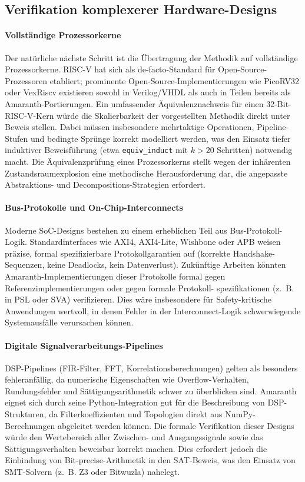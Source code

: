 ﻿\documentclass[12pt,a4paper]{report}
\begin{document}
\subsection{Verifikation komplexerer Hardware-Designs}

\paragraph{Vollständige Prozessorkerne}
Der natürliche nächste Schritt ist die Übertragung der Methodik auf vollständige
Prozessorkerne. RISC-V hat sich als de-facto-Standard für Open-Source-Prozessoren
etabliert; prominente Open-Source-Implementierungen wie PicoRV32 oder VexRiscv
existieren sowohl in Verilog/VHDL als auch in Teilen bereits als Amaranth-Portierungen.
Ein umfassender Äquivalenznachweis für einen 32-Bit-RISC-V-Kern würde die Skalierbarkeit
der vorgestellten Methodik direkt unter Beweis stellen. Dabei müssen insbesondere
mehrtaktige Operationen, Pipeline-Stufen und bedingte Sprünge korrekt modelliert werden,
was den Einsatz tiefer induktiver Beweisführung (etwa \texttt{equiv\_induct} mit
$k > 20$ Schritten) notwendig macht. Die Äquivalenzprüfung eines Prozessorkerns
stellt wegen der inhärenten Zustandsraumexplosion eine methodische Herausforderung dar,
die angepasste Abstraktions- und Decompositions-Strategien erfordert.

\paragraph{Bus-Protokolle und On-Chip-Interconnects}
Moderne SoC-Designs bestehen zu einem erheblichen Teil aus Bus-Protokoll-Logik.
Standardinterfaces wie AXI4, AXI4-Lite, Wishbone oder APB weisen präzise,
formal spezifizierbare Protokollgarantien auf (korrekte Handshake-Sequenzen,
keine Deadlocks, kein Datenverlust). Zukünftige Arbeiten könnten Amaranth-Implementierungen
dieser Protokolle formal gegen Referenzimplementierungen oder gegen formale Protokoll-
spezifikationen (z.~B. in PSL oder SVA) verifizieren. Dies wäre insbesondere für
Safety-kritische Anwendungen wertvoll, in denen Fehler in der Interconnect-Logik
schwerwiegende Systemausfälle verursachen können.

\paragraph{Digitale Signalverarbeitungs-Pipelines}
DSP-Pipelines (FIR-Filter, FFT, Korrelationsberechnungen) gelten als besonders
fehleranfällig, da numerische Eigenschaften wie Overflow-Verhalten, Rundungsfehler und
Sättigungsarithmetik schwer zu überblicken sind. Amaranth eignet sich durch seine
Python-Integration gut für die Beschreibung von DSP-Strukturen, da Filterkoeffizienten
und Topologien direkt aus NumPy-Berechnungen abgeleitet werden können. Die formale
Verifikation dieser Designs würde den Wertebereich aller Zwischen- und Ausgangssignale
sowie das Sättigungsverhalten beweisbar korrekt machen. Dies erfordert jedoch die
Einbindung von Bit-precise-Arithmetik in den SAT-Beweis, was den Einsatz von
SMT-Solvern (z.~B. Z3 oder Bitwuzla) nahelegt.
\end{document}
